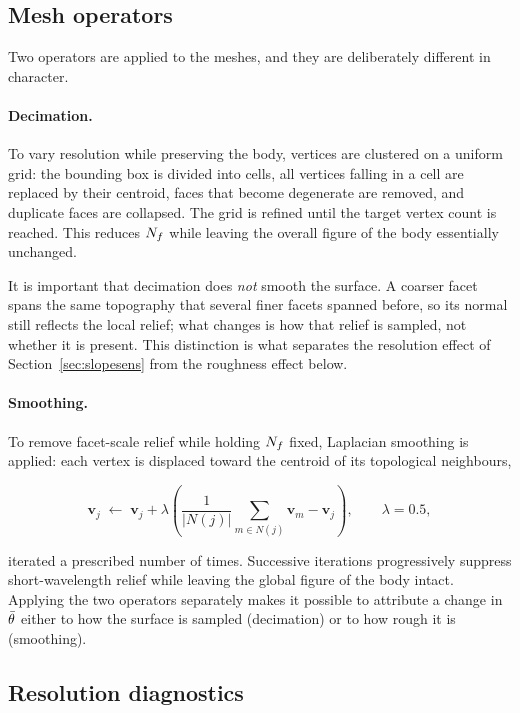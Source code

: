 \subsection{Mesh operators}
\label{sec:operators}

Two operators are applied to the meshes, and they are deliberately different in
character.

\paragraph{Decimation.} To vary resolution while preserving the body, vertices
are clustered on a uniform grid: the bounding box is divided into cells, all
vertices falling in a cell are replaced by their centroid, faces that become
degenerate are removed, and duplicate faces are collapsed. The grid is refined
until the target vertex count is reached. This reduces $N_{f}$ while leaving the
overall figure of the body essentially unchanged.

It is important that decimation does \emph{not} smooth the surface. A coarser
facet spans the same topography that several finer facets spanned before, so
its normal still reflects the local relief; what changes is how that relief is
sampled, not whether it is present. This distinction is what separates the
resolution effect of Section~\ref{sec:slopesens} from the roughness effect
below.

\paragraph{Smoothing.} To remove facet-scale relief while holding $N_{f}$ fixed,
Laplacian smoothing is applied: each vertex is displaced toward the centroid of
its topological neighbours,

\begin{equation}
\mathbf{v}_{j} \;\leftarrow\; \mathbf{v}_{j}
+ \lambda\left( \frac{1}{\lvert N(j)\rvert}\sum_{m\in N(j)}\mathbf{v}_{m}
- \mathbf{v}_{j}\right),
\qquad \lambda = 0.5,
\label{eq:laplace}
\end{equation}

iterated a prescribed number of times. Successive iterations progressively
suppress short-wavelength relief while leaving the global figure of the body
intact. Applying the two operators separately makes it possible to attribute a
change in $\bar{\theta}$ either to how the surface is sampled (decimation) or to
how rough it is (smoothing).

\subsection{Resolution diagnostics}
\label{sec:diagnostics}

